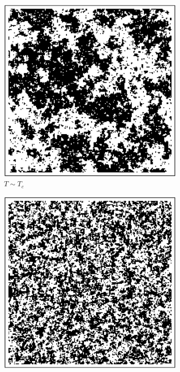 \documentclass[12pt,openright,twoside]{book}
\begin{document}
\begin{figure}
\begin{subfigure}[b]{0.3\linewidth}
    \includegraphics[width=\linewidth]{figures/t=t_c.PNG}
    \caption{$T\sim T_c$}
\end{subfigure}
\begin{subfigure}[b]{0.3\linewidth}
    \includegraphics[width=\linewidth]{figures/t>t_c.PNG}

\end{subfigure}
\end{figure}
\end{document}
